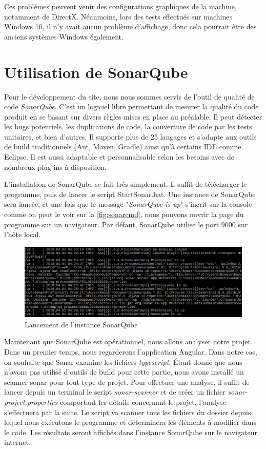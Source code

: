 \documentclass{polytech/polytech}
\begin{document}
Ces problèmes peuvent venir des configurations graphiques de la machine, notamment de DirectX. Néanmoins, lors des tests effectués sur machines Windows 10, il n'y avait aucun problème d'affichage, donc cela pourrait être des anciens systèmes Windows également.



\chapter{Utilisation de SonarQube}

Pour le développement du site, nous nous sommes servis de l'outil de qualité de code \textit{SonarQube}. C'est un logiciel libre permettant de mesurer la qualité du code produit en se basant sur divers règles mises en place au préalable. Il peut détecter les bugs potentiels, les duplications de code, la couverture de code par les tests unitaires, et bien d'autres. Il supporte plus de 25 langages et s'adapte aux outils de build traditionnels (Ant, Maven, Gradle) ainsi qu'à certains IDE comme Eclipse. Il est aussi adaptable et personnalisable selon les besoins avec de nombreux plug-ins à disposition.

L'installation de SonarQube se fait très simplement. Il suffit de télécharger le programme, puis de lancer le script StartSonar.bat. Une instance de SonarQube sera lancée, et une fois que le message "\textit{SonarQube is up}" s'incrit sur la console comme on peut le voir sur la \autoref{fig:sonarcmd}, nous pouvons ouvrir la page du programme sur un navigateur. Par défaut, SonarQube utilise le port 9000 sur l'hôte local.


\begin{figure}
	\includegraphics[scale=0.6]{sonarcmd.png}
	\caption{Lancement de l'instance SonarQube}
	\label{fig:sonarcmd}
\end{figure}


Maintenant que SonarQube est opérationnel, nous allons analyser notre projet. Dans un premier temps, nous regarderons l'application Angular. Dans notre cas, on souhaite que Sonar examine les fichiers \textit{typescript}. \'{E}tant donné que nous n'avons pas utilisé d'outils de build pour cette partie, nous avons installé un scanner sonar pour tout type de projet. Pour effectuer une analyse, il suffit de lancer depuis un terminal le script \textit{sonar-scanner} et de créer un fichier \textit{sonar-project.properties} comportant les détails concernant le projet, l'analyse s'effectuera par la suite. Le script va scanner tous les fichiers du dossier depuis lequel nous exécutons le programme et déterminera les éléments à modifier dans le code. Les résultats seront affichés dans l'instance SonarQube sur le navigateur internet.
\end{document}
